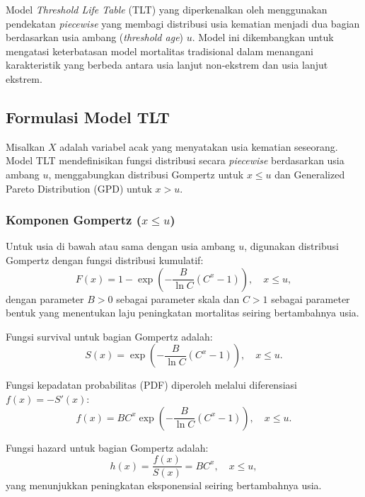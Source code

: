 Model \textit{Threshold Life Table} (TLT) yang diperkenalkan oleh \citet{li2008threshold} menggunakan pendekatan \textit{piecewise} yang membagi distribusi usia kematian menjadi dua bagian berdasarkan usia ambang (\textit{threshold age}) $u$. Model ini dikembangkan untuk mengatasi keterbatasan model mortalitas tradisional dalam menangani karakteristik yang berbeda antara usia lanjut non-ekstrem dan usia lanjut ekstrem.

\subsection{Formulasi Model TLT}

Misalkan $X$ adalah variabel acak yang menyatakan usia kematian seseorang. Model TLT mendefinisikan fungsi distribusi secara \textit{piecewise} berdasarkan usia ambang $u$, menggabungkan distribusi Gompertz untuk $x \leq u$ dan Generalized Pareto Distribution (GPD) untuk $x > u$.

\subsubsection{Komponen Gompertz ($x \leq u$)}

Untuk usia di bawah atau sama dengan usia ambang $u$, digunakan distribusi Gompertz dengan fungsi distribusi kumulatif:
\begin{equation}
F(x) = 1 - \exp\left(-\frac{B}{\ln C}(C^x - 1)\right), \quad x \leq u,
\label{eq:tlt_gompertz_cdf}
\end{equation}
dengan parameter $B > 0$ sebagai parameter skala dan $C > 1$ sebagai parameter bentuk yang menentukan laju peningkatan mortalitas seiring bertambahnya usia.

Fungsi survival untuk bagian Gompertz adalah:
\begin{equation}
S(x) = \exp\left(-\frac{B}{\ln C}(C^x - 1)\right), \quad x \leq u.
\label{eq:tlt_gompertz_survival}
\end{equation}

Fungsi kepadatan probabilitas (PDF) diperoleh melalui diferensiasi $f(x) = -S'(x)$:
\begin{equation}
f(x) = BC^x \exp\left(-\frac{B}{\ln C}(C^x - 1)\right), \quad x \leq u.
\label{eq:tlt_gompertz_pdf}
\end{equation}

Fungsi hazard untuk bagian Gompertz adalah:
\begin{equation}
h(x) = \frac{f(x)}{S(x)} = BC^x, \quad x \leq u,
\label{eq:tlt_gompertz_hazard}
\end{equation}
yang menunjukkan peningkatan eksponensial seiring bertambahnya usia.

